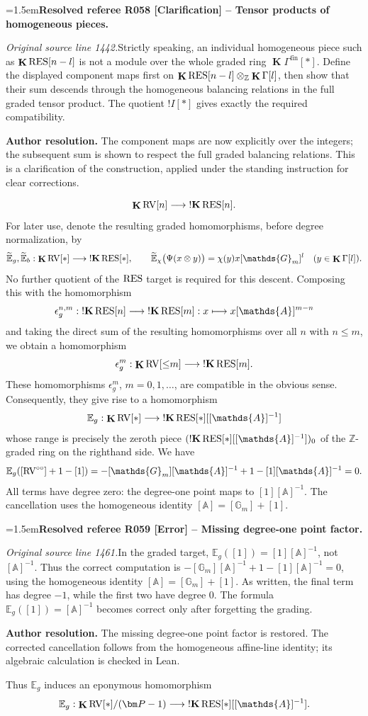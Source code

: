 \documentclass[12pt]{amsart}
\newcommand{\ResolvedRefereeRemark}[5]{%
  \par\medskip\begingroup\normalfont\small\color{gray}%
  \emergencystretch=1.5em\noindent\textbf{Resolved referee R#1 [#2] -- #3.}\par\nobreak\noindent #4\par
  \medskip\color{ResolutionGreen}\noindent\textbf{Author resolution.} #5\par
  \endgroup\medskip
}
\theoremstyle{plain}
\theoremstyle{definition}
\theoremstyle{remark}
\numberwithin{equation}{section}
\theoremstyle{plain}
\newcommand{\RV}{\textup{RV}}
\newcommand{\Z}{\mathds{Z}}
\newcommand{\A}{\mathds{A}}
\newcommand{\G}{\mathds{G}}
\newcommand{\0}{\emptyset}
\newcommand{\bb}[1]{\mathbb{#1}}
\newcommand{\fun}{\longrightarrow}
\newcommand{\efun}{\longmapsto}
\newcommand{\RES}{\textup{RES}}
\DeclareMathOperator{\ggk}{\mathbf{K}}
\DeclareMathOperator{\sggk}{!\mathbf{K}}
\DeclareMathOperator{\fin}{fin}
\newcommand{\ccirc}{\circ \circ}
\begin{document}
\ResolvedRefereeRemark{058}{Clarification}{Tensor products of homogeneous pieces}{%
\textit{Original source line 1442.}\quad Strictly speaking, an individual homogeneous piece such as $\ggk\RES[n-l]$ is not a module over the whole graded ring $\ggk\Gamma^{\fin}[*]$. Define the displayed component maps first on $\ggk\RES[n-l]\otimes_{\mathbb Z}\ggk\Gamma[l]$, then show that their sum descends through the homogeneous balancing relations in the full graded tensor product. The quotient $!I[*]$ gives exactly the required compatibility.
}{The component maps are now explicitly over the integers; the subsequent sum is shown to respect the full graded balancing relations. This is a clarification of the construction, applied under the standing instruction for clear corrections.}
\[
\ggk \RV[n] \fun \sggk \RES[n].
\]
For later use, denote the resulting graded homomorphisms, before degree normalization, by
\[
\widetilde{\bb E}_g,\widetilde{\bb E}_b:
\ggk\RV[*]\fun\sggk\RES[*],
\qquad
\widetilde{\bb E}_{\chi}\bigl(\Psi(x\otimes y)\bigr)
=\chi(y)x[\G_m]^l
\quad(y\in\ggk\Gamma[l]).
\]
No further quotient of the $\RES$ target is required for this descent.
Composing this with the homomorphism
\[
\epsilon^{n,m}_g : \sggk \RES[n]  \fun \sggk \RES[m] : x \efun x [\A]^{m-n}
\]
and taking the direct sum of the resulting homomorphisms over all $n$ with $n \leq m$, we obtain a homomorphism
\[
\epsilon^m_g : \ggk \RV[{\leq} m] \fun \sggk \RES[m].
\]
These homomorphisms $\epsilon^m_g$, $m = 0, 1, \ldots$, are compatible in the obvious sense. Consequently, they give rise to a homomorphism
\[
\bb E_g : \ggk \RV[*] \fun \sggk \RES[*][[\A]^{-1}]
\]
whose range is precisely the zeroth piece $(\sggk \RES[*][[\A]^{-1}])_0$ of the $\Z$-graded ring on the righthand side. We have
\begin{equation}\label{eg:isp:van}
\bb E_g([\RV^{\ccirc}] + 1 - [1]) = - [\G_m][\A]^{-1} + 1 - [1][\A]^{-1} = 0.
\end{equation}
All terms have degree zero: the degree-one point maps to $[1][\A]^{-1}$. The cancellation uses the homogeneous identity $[\A]=[\G_m]+[1]$.
\label{review:section4:tensor:end}


\ResolvedRefereeRemark{059}{Error}{Missing degree-one point factor}{%
\textit{Original source line 1461.}\quad In the graded target, $\mathbb E_g([1])=[1][\mathbb A]^{-1}$, not $[\mathbb A]^{-1}$. Thus the correct computation is $-[\mathbb G_m][\mathbb A]^{-1}+1-[1][\mathbb A]^{-1}=0$, using the homogeneous identity $[\mathbb A]=[\mathbb G_m]+[1]$. As written, the final term has degree $-1$, while the first two have degree $0$. The formula $\mathbb E_g([1])=[\mathbb A]^{-1}$ becomes correct only after forgetting the grading.
}{The missing degree-one point factor is restored. The corrected cancellation follows from the homogeneous affine-line identity; its algebraic calculation is checked in Lean.}
Thus $\bb E_g$ induces an eponymous homomorphism
\[
\bb E_g : \ggk \RV[*] / (\bm P - 1) \fun \sggk \RES[*][[\A]^{-1}].
\]
\end{document}
